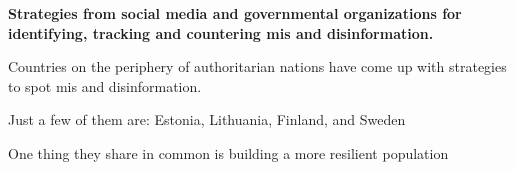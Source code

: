 \documentclass[nobackground,dvipsnames,table]{beamer}
\begin{document}
\begin{frame}{}

\begin{minipage}{0.4\textwidth}
    \raggedright\Large{\textbf{Strategies from social media and governmental organizations for identifying, tracking and countering mis and disinformation.}}
\end{minipage}
\hspace{0.05\textwidth}
\begin{minipage}{0.5\textwidth}

    \begin{itemize}
    \small{
        \item Countries on the periphery of authoritarian nations have come up with strategies to spot mis and disinformation.
        \item Just a few of them are: Estonia, Lithuania, Finland, and Sweden
        \item One thing they share in common is building a more resilient population
    }
    \end{itemize}
\end{minipage}
\end{frame}
\end{document}
